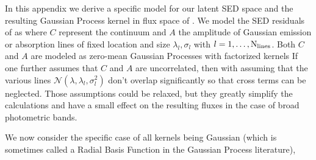 \documentclass[aps,prd,showpacs,superscriptaddress,groupedaddress]{revtex4}  %
\begin{document}
In this appendix we derive a specific model for our latent SED space and the resulting Gaussian Process kernel in flux space of .
We model the SED residuals of  as
where $C$ represent the continuum and $A$ the amplitude of Gaussian emission or absorption lines of fixed location and size $ \lambda_l, \sigma_l$ with $l = 1, \ldots, {\rm N}_{\rm lines}$. 
Both $C$ and $A$ are modeled as zero-mean Gaussian Processes with factorized kernels
If one further assumes that $C$ and $A$ are uncorrelated, then 
with 
assuming that the various lines $\mathcal{N}(\lambda, \lambda_l, \sigma^2_l)$ don't overlap significantly so that cross terms can be neglected. 
Those assumptions could be relaxed, but they greatly simplify the calculations and have a small effect on the resulting fluxes in the case of broad photometric bands.

We now consider the specific case of all kernels being Gaussian (which is sometimes called a Radial Basis Function in the Gaussian Process literature),
\end{document}

